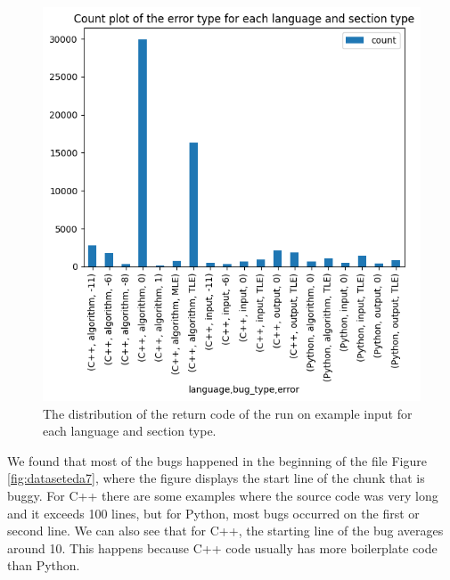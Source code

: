 \documentclass[12pt,a4paper]{report}
\begin{document}
\begin{figure}[hp!]
\centering
\includegraphics[width=\textwidth]{pics/submissionstatuscode.png}
  \caption{The distribution of the return code of the run on example input for each language and section type.}
  \label{fig:dataseteda6}
\end{figure}

\newpage

We found that most of the bugs happened in the beginning of the file Figure \ref{fig:dataseteda7}, where the figure displays the start line of the chunk that is buggy. For C++ there are some examples where the source code was very long and it exceeds 100 lines, but for Python, most bugs occurred on the first or second line. We can also see that for C++, the starting line of the bug averages around 10. This happens because C++ code usually has more boilerplate code than Python.
\end{document}

